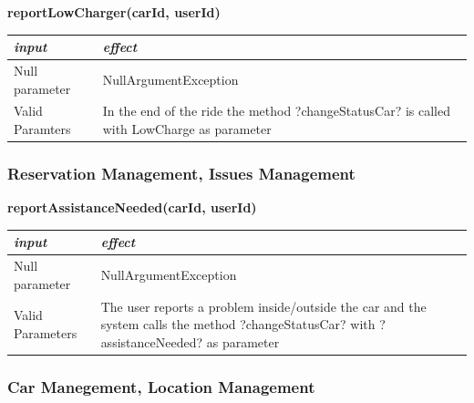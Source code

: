 \documentclass{article}
\begin{document}
\begin{flushleft}
  \begin{center}
   \begin {flushleft}
    \textbf{reportLowCharger(carId, userId)}
    \end{flushleft}
        \begin{tabular}{  |  p{6cm} | p{6cm} |}
    \hline
    \textit{input} &  \textit{effect} \\
    \hline
    
    Null parameter & NullArgumentException
     \\ 
  \hline
Valid Paramters & In the end of the ride the method ?changeStatusCar? is called with LowCharge as parameter\\
  \hline

    \end{tabular}
\end{center}
     
\subsubsection{Reservation  Management, Issues Management}%


  \begin{center}
   \begin {flushleft}
    \textbf{reportAssistanceNeeded(carId, userId)}
    \end{flushleft}
        \begin{tabular}{  |  p{6cm} | p{6cm} |}
    \hline
    \textit{input} &  \textit{effect} \\
    \hline
    
   Null parameter & NullArgumentException 
    
     \\ 
  \hline
   Valid Parameters & The user reports a problem inside/outside the car and the system calls the method ?changeStatusCar? with ?assistanceNeeded? as parameter  \\
  \hline

    \end{tabular}
\end{center}




     
      \subsubsection{Car Manegement, Location Management } %
      

\end{flushleft}
\end{document}
